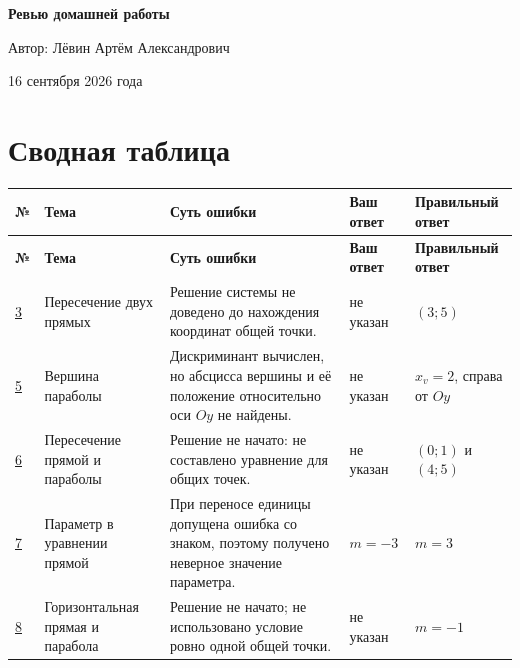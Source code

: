 \documentclass[12pt,a4paper]{article}
\begin{document}
\thispagestyle{empty}
\vspace*{\fill}
\begin{center}
  {\Huge\bfseries Ревью домашней работы}\par
  \vspace{1.4cm}
  {\large Автор: Лёвин Артём Александрович}\par
  \vspace{0.6cm}
  {\large 16 сентября 2026 года}\par
\end{center}
\vspace*{\fill}
\begin{center}
\end{center}
\newpage

\section*{Сводная таблица}
\small
\begin{longtable}{>{\centering\arraybackslash}p{0.8cm} p{3.1cm} p{4.7cm} p{2.4cm} p{3.1cm}}
\toprule
\textbf{№} & \textbf{Тема} & \textbf{Суть ошибки} & \textbf{Ваш ответ} & \textbf{Правильный ответ} \\
\midrule
\endfirsthead
\toprule
\textbf{№} & \textbf{Тема} & \textbf{Суть ошибки} & \textbf{Ваш ответ} & \textbf{Правильный ответ} \\
\midrule
\endhead
\hyperref[task:3]{3} & Пересечение двух прямых & Решение системы не доведено до нахождения координат общей точки. & не указан & $(3;5)$ \\
\addlinespace
\hyperref[task:5]{5} & Вершина параболы & Дискриминант вычислен, но абсцисса вершины и её положение относительно оси $Oy$ не найдены. & не указан & $x_v=2$, справа от $Oy$ \\
\addlinespace
\hyperref[task:6]{6} & Пересечение прямой и параболы & Решение не начато: не составлено уравнение для общих точек. & не указан & $(0;1)$ и $(4;5)$ \\
\addlinespace
\hyperref[task:7]{7} & Параметр в уравнении прямой & При переносе единицы допущена ошибка со знаком, поэтому получено неверное значение параметра. & $m=-3$ & $m=3$ \\
\addlinespace
\hyperref[task:8]{8} & Горизонтальная прямая и парабола & Решение не начато; не использовано условие ровно одной общей точки. & не указан & $m=-1$ \\
\bottomrule
\end{longtable}
\normalsize
\end{document}
